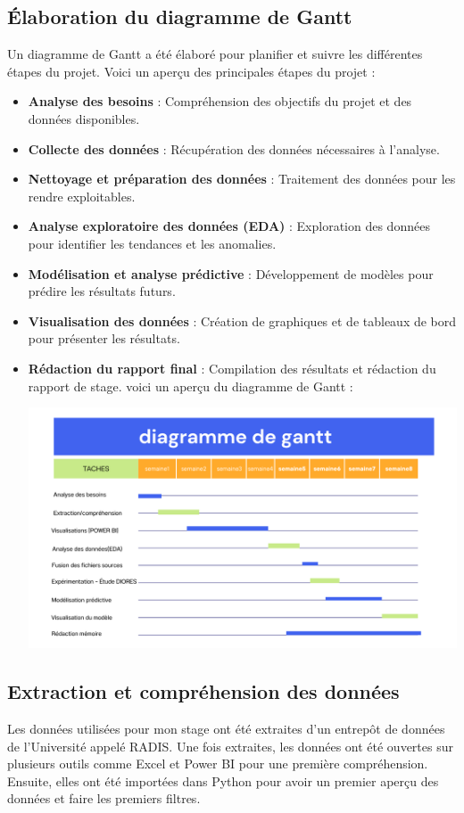\subsection{Élaboration du diagramme de Gantt} 
Un diagramme de Gantt a été élaboré pour planifier et suivre les différentes étapes du projet. Voici un aperçu des principales étapes du projet :
\begin{itemize}
    \item \textbf{Analyse des besoins} : Compréhension des objectifs du projet et des données disponibles.
    \item \textbf{Collecte des données} : Récupération des données nécessaires à l'analyse.
    \item \textbf{Nettoyage et préparation des données} : Traitement des données pour les rendre exploitables.
    \item \textbf{Analyse exploratoire des données (EDA)} : Exploration des données pour identifier les tendances et les anomalies.
    \item \textbf{Modélisation et analyse prédictive} : Développement de modèles pour prédire les résultats futurs.
    \item \textbf{Visualisation des données} : Création de graphiques et de tableaux de bord pour présenter les résultats.
    \item \textbf{Rédaction du rapport final} : Compilation des résultats et rédaction du rapport de stage. 
    voici un aperçu du diagramme de Gantt :
    \begin{center}
    \includegraphics[width=1\textwidth]{image/Gantt.png} 
    \end{center}

\end{itemize} 

\subsection{Extraction et compréhension des données} 
Les données utilisées pour mon stage ont été extraites d'un entrepôt de données de l'Université appelé RADIS. Une fois extraites, les données ont été ouvertes sur plusieurs outils comme Excel et Power BI pour une première compréhension. Ensuite, elles ont été importées dans Python pour avoir un premier aperçu des données et faire les premiers filtres. 

